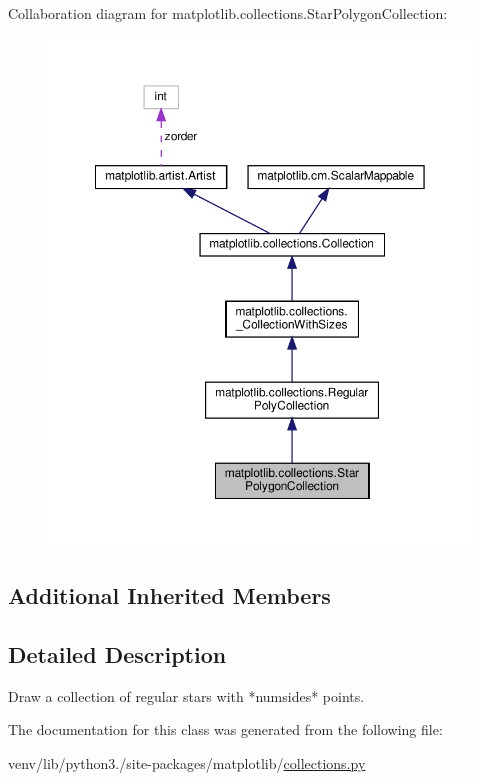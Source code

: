 Collaboration diagram for matplotlib.\+collections.\+Star\+Polygon\+Collection\+:
\nopagebreak
\begin{figure}[H]
\begin{center}
\leavevmode
\includegraphics[width=350pt]{classmatplotlib_1_1collections_1_1StarPolygonCollection__coll__graph}
\end{center}
\end{figure}
\subsection*{Additional Inherited Members}


\subsection{Detailed Description}
\begin{DoxyVerb}Draw a collection of regular stars with *numsides* points.\end{DoxyVerb}
 

The documentation for this class was generated from the following file\+:\begin{DoxyCompactItemize}
\item 
venv/lib/python3./site-\/packages/matplotlib/\hyperlink{collections_8py}{collections.\+py}\end{DoxyCompactItemize}
